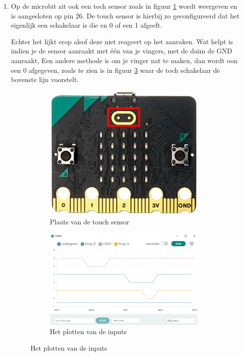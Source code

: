 \begin{enumerate}[label=\alph*)]
\item Op de microbit zit ook een toch sensor zoals in figuur \ref{fig:microbitFront} wordt weergeven en is aangesloten op pin 26. De touch sensor is hierbij zo geconfigureerd dat het eigenlijk een schakelaar is die en 0 of een 1 afgeeft.

Echter het lijkt erop alsof deze niet reageert op het aanraken. Wat helpt is indien je de sensor aanraakt met één van je vingers, met de duim de GND aanraakt, Een andere methode is om je vinger nat te maken, dan wordt oon een 0 afgegeven, zoals te zien is in figuur \ref{fig:plotLog} waar de toch schakelaar de bovenste lijn voorstelt.

\begin{figure}[H]
	\centering

		\begin{subfigure}[b]{0.35\textwidth}
			\includegraphics[width=0.95\textwidth]{figuren/microbitFront}
			\caption{Plaats van de touch sensor }
			\label{fig:microbitFront}
		\end{subfigure}
\begin{subfigure}[b]{0.64\textwidth}
	\includegraphics[width=0.95\textwidth]{figuren/plotMetLogo}
	\caption{Het plotten van de inputs }
	\label{fig:plotLog}
	

\end{subfigure}
\end{figure}
\end{enumerate}
